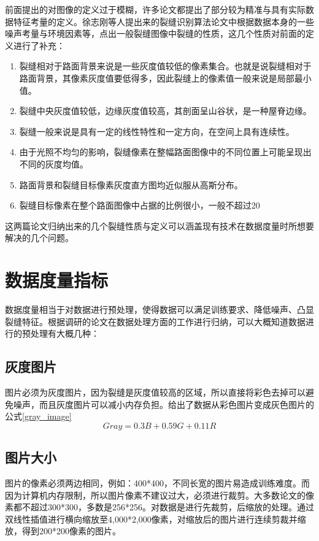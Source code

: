 \documentclass[a4paper,UTF8]{article}
\theoremstyle{definition}
\begin{document}
    前面提出的对图像的定义过于模糊，许多论文都提出了部分较为精准与具有实际数据特征考量的定义。徐志刚等人提出来的裂缝识别算法论文\cite{6}中根据数据本身的一些噪声考量与环境因素等，点出一般裂缝图像中裂缝的性质，这几个性质对前面的定义进行了补充：
    \begin{enumerate}[性质1]
    	\item 裂缝相对于路面背景来说是一些灰度值较低的像素集合。也就是说裂缝相对于路面背景，其像素灰度值要低得多，因此裂缝上的像素值一般来说是局部最小值。
    	\item 裂缝中央灰度值较低，边缘灰度值较高，其剖面呈山谷状，是一种屋脊边缘。
    	\item 裂缝一般来说是具有一定的线性特性和一定方向，在空间上具有连续性。
    	\item 由于光照不均匀的影响，裂缝像素在整幅路面图像中的不同位置上可能呈现出不同的灰度均值。
    	\item 路面背景和裂缝目标像素灰度直方图均近似服从高斯分布。
    	\item 裂缝目标像素在整个路面图像中占据的比例很小，一般不超过20%
    \end{enumerate}
    
    这两篇论文归纳出来的几个裂缝性质与定义可以涵盖现有技术在数据度量时所想要解决的几个问题。
    \section{数据度量指标}
    数据度量相当于对数据进行预处理，使得数据可以满足训练要求、降低噪声、凸显裂缝特征。根据调研的论文在数据处理方面的工作进行归纳，可以大概知道数据进行的预处理有大概几种：
    \subsection{灰度图片}
    图片必须为灰度图片，因为裂缝是灰度值较高的区域，所以直接将彩色去掉可以避免噪声，而且灰度图片可以减小内存负担。\cite{7}给出了数据从彩色图片变成灰色图片的公式\ref{gray_image}
    \begin{equation}
    Gray = 0.3B + 0.59G + 0.11R
    \label{gray_image}
    \end{equation}
    \subsection{图片大小}
    图片的像素必须两边相同，例如：400*400，不同长宽的图片易造成训练难度。而因为计算机内存限制，所以图片像素不建议过大，必须进行裁剪。大多数论文的像素都不超过300*300，多数是256*256。\cite{1}对数据是进行先裁剪，后缩放的处理。通过双线性插值进行横向缩放至4,000*2,000像素，对缩放后的图片进行连续剪裁并缩放，得到200*200像素的图片。
\end{document}
